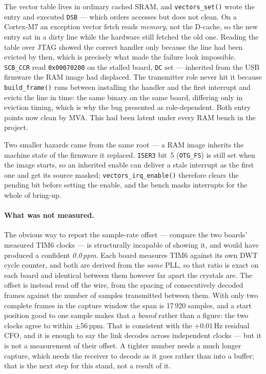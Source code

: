 The vector table lives in ordinary cached SRAM, and
\texttt{vectors\_set()} wrote the entry and executed \texttt{DSB} ---
which orders accesses but does not clean. On a Cortex-M7 an exception
vector fetch reads \emph{memory}, not the D-cache, so the new entry sat
in a dirty line while the hardware still fetched the old one. Reading
the table over JTAG showed the correct handler only because the line had
been evicted by then, which is precisely what made the failure look
impossible. \texttt{SCB\_CCR} read \texttt{0x00070200} on the stalled
board, \texttt{DC} set --- inherited from the USB firmware the RAM image
had displaced. The transmitter role never hit it because
\texttt{build\_frame()} runs between installing the handler and the
first interrupt and evicts the line in time: the same binary on the same
board, differing only in eviction timing, which is why the bug presented
as role-dependent. Both entry points now clean by MVA. This had been
latent under every RAM bench in the project.

Two smaller hazards came from the same root --- a RAM image inherits the
machine state of the firmware it replaced. \texttt{ISER3} bit~5
(\texttt{OTG\_FS}) is still set when the image starts, so an inherited
enable can deliver a stale interrupt as the first one and get its source
masked; \texttt{vectors\_irq\_enable()} therefore clears the pending bit
before setting the enable, and the bench masks interrupts for the whole
of bring-up.

\paragraph{What was not measured.} The obvious way to report the
sample-rate offset --- compare the two boards' measured TIM6 clocks ---
is structurally incapable of showing it, and would have produced a
confident \emph{0.0\,ppm}. Each board measures TIM6 against its own DWT
cycle counter, and both are derived from the \emph{same} PLL, so that
ratio is exact on each board and identical between them however far
apart the crystals are. The offset is instead read off the wire, from
the spacing of consecutively decoded frames against the number of
samples transmitted between them. With only two complete frames in the
capture window the span is 17\,920 samples, and a start position good to
one sample makes that a \emph{bound} rather than a figure: the two
clocks agree to within $\pm$56\,ppm. That is consistent with the
$+0.01$\,Hz residual CFO, and it is enough to say the link decodes
across independent clocks --- but it is not a measurement of their
offset. A tighter number needs a much longer capture, which needs the
receiver to decode as it goes rather than into a buffer; that is the
next step for this stand, not a result of it.

